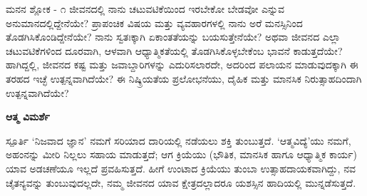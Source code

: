 
\newpage
\begin{mananam}{\mananamfont \large \large ಮನನ ಶ್ಲೋಕ - ೧}
\mananamtext ಜೀವನದಲ್ಲಿ ನಾನು ಚಟುವಟಿಕೆಯಿಂದ ಇರಬೇಕೋ ಬೇಡವೋ ಎನ್ನುವ ಅನುಮಾನದಲ್ಲಿದ್ದೇನೆಯೇ? ಪ್ರಾಪಂಚಿಕ ವಿಷಯ ಮತ್ತು ವ್ಯವಹಾರಗಳಲ್ಲಿ  ನಾನು ಅರೆ ಮನಸ್ಸಿನಿಂದ ತೊಡಗಿಸಿಕೊಂಡಿದ್ದೇನೆಯೇ? ನಾನು ಸ್ವತಃಕ್ಕಾಗಿ ಏಕಾಂತತೆಯನ್ನು ಬಯಸುತ್ತೇನೆಯೇ? ಅಥವಾ ಜೀವನದ ಎಲ್ಲಾ ಚಟುವಟಿಕೆಗಳಿಂದ ದೂರವಾಗಿ, ಆಳವಾಗಿ ಆಧ್ಯಾತ್ಮಿಕತೆಯಲ್ಲಿ ತೊಡಗಿಸಿಕೊಳ್ಳಬೇಕೆಂಬ ಭಾವನೆ ಕಾಡುತ್ತದೆಯೇ? ಹಾಗಿದ್ದಲ್ಲಿ, ಜೀವನದ ಕಷ್ಟ ಮತ್ತು ಜವಾಬ್ದಾರಿಗಳನ್ನು ಎದುರಿಸಲಾರದೇ, ಅದರಿಂದ ಪಲಾಯನ ಮಾಡುವುದಕ್ಕಾಗಿ ಈ ತರಹದ ಇಚ್ಛೆ ಉತ್ಪನ್ನವಾಗಿದೆಯೇ? ಈ ನಿಷ್ಕ್ರಿಯತೆಯ ಪ್ರಲೋಭನೆಯು, ದೈಹಿಕ ಮತ್ತು ಮಾನಸಿಕ ನಿರುತ್ಸಾಹದಿಂದಾಗಿ ಉತ್ಪನ್ನವಾಗಿದೆಯೇ?
\end{mananam}
\WritingHand\enspace\textbf{ಆತ್ಮ ವಿಮರ್ಶೆ}\\
\begin{inspiration}{\mananamfont \large \large ಸ್ಪೂರ್ತಿ}
\mananamtext ‘ನಿಜವಾದ ಜ್ಞಾನ’ ನಮಗೆ ಸರಿಯಾದ ದಾರಿಯಲ್ಲಿ ನಡೆಯಲು ಶಕ್ತಿ ತುಂಬುತ್ತದೆ. ‘ಆತ್ಮವಿದ್ಯೆ’ಯು ನಮಗೆ, ಅಹಂನನ್ನು ಮೀರಿ ನಿಲ್ಲಲು ಸಹಾಯ ಮಾಡುತ್ತದೆ; ಆಗ ಕ್ರಿಯೆಯು (ಭೌತಿಕ, ಮಾನಸಿಕ ಹಾಗೂ ಆಧ್ಯಾತ್ಮಿಕ ಕಾರ್ಯ) ಯಾವ ಅಡಚಣೆಯೂ ಇಲ್ಲದೆ ಪ್ರವಹಿಸುತ್ತದೆ. ಹೀಗೆ ಉಂಟಾದ ಕ್ರಿಯೆಯು ತುಂಬಾ ಉತ್ಸಾಹದಾಯಕವಾಗಿದ್ದು, ನವ ಚೈತನ್ಯವನ್ನು ತುಂಬುವುದಲ್ಲದೇ, ನಮ್ಮ ಜೀವನದ ಯಾವ ಕ್ಷೇತ್ರದಲ್ಲಾದರೂ ಯಶಸ್ಸಿನ ಹಾದಿಯಲ್ಲಿ ಮುನ್ನಡೆಸುತ್ತದೆ.  
\end{inspiration}
\newpage

